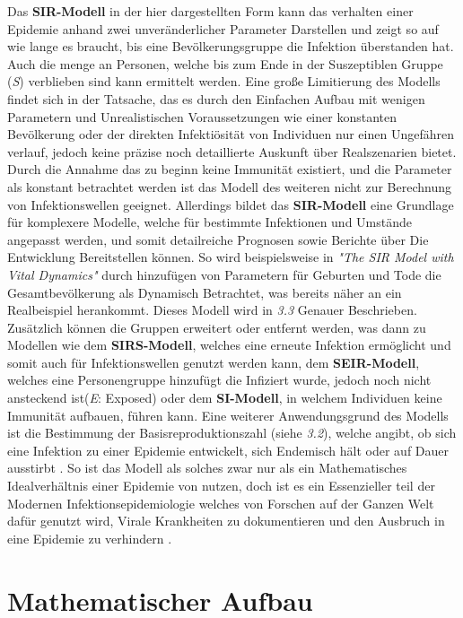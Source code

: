 \documentclass[12pt]{scrartcl} %
\begin{document}
Das \textbf{SIR-Modell} in der hier dargestellten Form kann das verhalten einer Epidemie anhand zwei unveränderlicher Parameter Darstellen und zeigt so auf wie lange es braucht, bis eine Bevölkerungsgruppe die Infektion überstanden hat. Auch die menge an Personen, welche bis zum Ende in der Suszeptiblen Gruppe (\textit{S}) verblieben sind kann ermittelt werden. 
Eine große Limitierung des Modells findet sich in der Tatsache, das es durch den Einfachen Aufbau mit wenigen Parametern und Unrealistischen Voraussetzungen wie einer konstanten Bevölkerung oder der direkten Infektiösität von Individuen nur einen Ungefähren verlauf, jedoch keine präzise noch detaillierte Auskunft über Realszenarien bietet.
Durch die Annahme das zu beginn keine Immunität existiert, und die Parameter als konstant betrachtet werden ist das Modell des weiteren nicht zur Berechnung von Infektionswellen geeignet.
Allerdings bildet das \textbf{SIR-Modell} eine Grundlage für komplexere Modelle, welche für bestimmte Infektionen und Umstände angepasst werden, und somit detailreiche Prognosen sowie Berichte über Die Entwicklung Bereitstellen können.
So wird beispielsweise in \textsl{"The SIR Model with Vital Dynamics"} \cite{5} durch hinzufügen von Parametern für Geburten und Tode die Gesamtbevölkerung als Dynamisch Betrachtet, was bereits näher an ein Realbeispiel herankommt.
Dieses Modell wird in \textsl{3.3} Genauer Beschrieben.\\
Zusätzlich können die Gruppen erweitert oder entfernt werden, was dann zu Modellen wie dem 
\textbf{SIRS-Modell}, welches eine erneute Infektion ermöglicht und somit auch für Infektionswellen genutzt werden kann, dem \textbf{SEIR-Modell}, welches eine Personengruppe hinzufügt die Infiziert wurde, jedoch noch nicht ansteckend ist(\textit{E}: Exposed) oder dem \textbf{SI-Modell}, in welchem Individuen keine Immunität aufbauen, führen kann.
Eine weiterer Anwendungsgrund des Modells ist die Bestimmung der Basisreproduktionszahl (siehe \textsl{3.2}), welche angibt, ob sich eine Infektion zu einer Epidemie entwickelt, sich Endemisch hält oder auf Dauer ausstirbt \cite{2}.
So ist das Modell als solches zwar nur als ein Mathematisches Idealverhältnis einer Epidemie von nutzen, doch ist es ein Essenzieller teil der Modernen Infektionsepidemiologie welches von Forschen auf der Ganzen Welt dafür genutzt wird, Virale Krankheiten zu dokumentieren und den Ausbruch in eine Epidemie zu verhindern \cite{3}.

\section{Mathematischer Aufbau}
\end{document}
